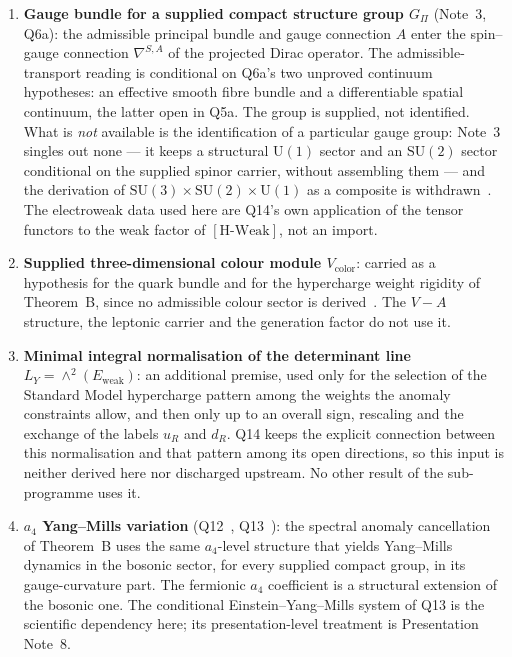\documentclass[11pt,a4paper]{article}
\theoremstyle{definition}
\newcommand{\SU}{\mathrm{SU}}
\newcommand{\UU}{\mathrm{U}}
\newcommand{\Ew}{E_{\mathrm{weak}}}
\newcommand{\HWeak}{\ensuremath{[\mathrm{H\text{-}Weak}]}}
\begin{document}
\begin{enumerate}
      \item \textbf{Gauge bundle for a supplied compact structure group $G_\Pi$} (Note~3, Q6a):
      the admissible principal bundle and gauge connection $A$ enter the spin--gauge
      connection $\nabla^{S,A}$ of the projected Dirac operator.
      The admissible-transport reading is conditional on Q6a's two unproved continuum hypotheses:
      an effective smooth fibre bundle and a differentiable spatial continuum, the latter open in Q5a.
      The group is supplied, not identified.
      What is \emph{not} available is the identification of a particular gauge group: Note~3 singles
      out none --- it keeps a structural $\UU(1)$ sector and an $\SU(2)$ sector conditional on the
      supplied spinor carrier, without assembling them --- and the derivation of
      $\SU(3) \times \SU(2) \times \UU(1)$ as a composite is withdrawn~\cite{Beau2026a35}.
      The electroweak data used here are Q14's own application of the tensor functors to the weak factor of
      \HWeak{}, not an import.

      \item \textbf{Supplied three-dimensional colour module $V_{\mathrm{color}}$}:
      carried as a hypothesis for the quark bundle and for the hypercharge weight rigidity of
      Theorem~B, since no admissible colour sector is derived~\cite{Beau2026a35}.
      The $V-A$ structure, the leptonic carrier and the generation factor do not use it.

      \item \textbf{Minimal integral normalisation of the determinant line $L_Y = \wedge^2(\Ew)$}:
      an additional premise, used only for the selection of the Standard Model hypercharge pattern
      among the weights the anomaly constraints allow, and then only up to an overall sign, rescaling and the
      exchange of the labels $u_R$ and $d_R$.
      Q14 keeps the explicit connection between this normalisation and that pattern among its open
      directions, so this input is neither derived here nor discharged upstream.
      No other result of the sub-programme uses it.

      \item \textbf{$a_4$ Yang--Mills variation} (Q12~\cite{Beau2026q12}, Q13~\cite{Beau2026q13}):
      the spectral anomaly cancellation of Theorem~B uses the same $a_4$-level structure
      that yields Yang--Mills dynamics in the bosonic sector, for every supplied compact group, in its
      gauge-curvature part.
      The fermionic $a_4$ coefficient is a structural extension of the bosonic one.
      The conditional Einstein--Yang--Mills system of Q13 is the scientific dependency here;
      its presentation-level treatment is Presentation Note~8.


\end{enumerate}
\end{document}
